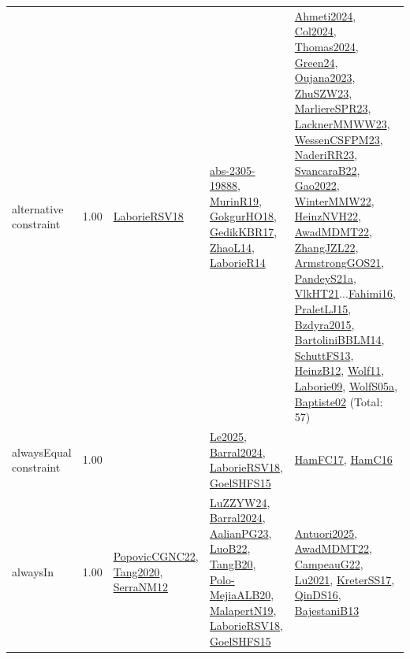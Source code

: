 {\begin{longtable}{p{3cm}r>{\raggedright\arraybackslash}p{6cm}>{\raggedright\arraybackslash}p{6cm}>{\raggedright\arraybackslash}p{8cm}}
\index{alternative constraint}\index{Constraints!alternative constraint}alternative constraint &  1.00 & \hyperref[detail:LaborieRSV18]{LaborieRSV18} & \hyperref[detail:abs-2305-19888]{abs-2305-19888}, \hyperref[detail:MurinR19]{MurinR19}, \hyperref[detail:GokgurHO18]{GokgurHO18}, \hyperref[detail:GedikKBR17]{GedikKBR17}, \hyperref[detail:ZhaoL14]{ZhaoL14}, \hyperref[detail:LaborieR14]{LaborieR14} & \hyperref[detail:Ahmeti2024]{Ahmeti2024}, \hyperref[detail:Col2024]{Col2024}, \hyperref[detail:Thomas2024]{Thomas2024}, \hyperref[detail:Green24]{Green24}, \hyperref[detail:Oujana2023]{Oujana2023}, \hyperref[detail:ZhuSZW23]{ZhuSZW23}, \hyperref[detail:MarliereSPR23]{MarliereSPR23}, \hyperref[detail:LacknerMMWW23]{LacknerMMWW23}, \hyperref[detail:WessenCSFPM23]{WessenCSFPM23}, \hyperref[detail:NaderiRR23]{NaderiRR23}, \hyperref[detail:SvancaraB22]{SvancaraB22}, \hyperref[detail:Gao2022]{Gao2022}, \hyperref[detail:WinterMMW22]{WinterMMW22}, \hyperref[detail:HeinzNVH22]{HeinzNVH22}, \hyperref[detail:AwadMDMT22]{AwadMDMT22}, \hyperref[detail:ZhangJZL22]{ZhangJZL22}, \hyperref[detail:ArmstrongGOS21]{ArmstrongGOS21}, \hyperref[detail:PandeyS21a]{PandeyS21a}, \hyperref[detail:VlkHT21]{VlkHT21}...\hyperref[detail:Fahimi16]{Fahimi16}, \hyperref[detail:PraletLJ15]{PraletLJ15}, \hyperref[detail:Bzdyra2015]{Bzdyra2015}, \hyperref[detail:BartoliniBBLM14]{BartoliniBBLM14}, \hyperref[detail:SchuttFS13]{SchuttFS13}, \hyperref[detail:HeinzB12]{HeinzB12}, \hyperref[detail:Wolf11]{Wolf11}, \hyperref[detail:Laborie09]{Laborie09}, \hyperref[detail:WolfS05a]{WolfS05a}, \hyperref[detail:Baptiste02]{Baptiste02} (Total: 57)\\
\index{alwaysEqual constraint}\index{Constraints!alwaysEqual constraint}alwaysEqual constraint &  1.00 &  & \hyperref[detail:Le2025]{Le2025}, \hyperref[detail:Barral2024]{Barral2024}, \hyperref[detail:LaborieRSV18]{LaborieRSV18}, \hyperref[detail:GoelSHFS15]{GoelSHFS15} & \hyperref[detail:HamFC17]{HamFC17}, \hyperref[detail:HamC16]{HamC16}\\
\index{alwaysIn}\index{Constraints!alwaysIn}alwaysIn &  1.00 & \hyperref[detail:PopovicCGNC22]{PopovicCGNC22}, \hyperref[detail:Tang2020]{Tang2020}, \hyperref[detail:SerraNM12]{SerraNM12} & \hyperref[detail:LuZZYW24]{LuZZYW24}, \hyperref[detail:Barral2024]{Barral2024}, \hyperref[detail:AalianPG23]{AalianPG23}, \hyperref[detail:LuoB22]{LuoB22}, \hyperref[detail:TangB20]{TangB20}, \hyperref[detail:Polo-MejiaALB20]{Polo-MejiaALB20}, \hyperref[detail:MalapertN19]{MalapertN19}, \hyperref[detail:LaborieRSV18]{LaborieRSV18}, \hyperref[detail:GoelSHFS15]{GoelSHFS15} & \hyperref[detail:Antuori2025]{Antuori2025}, \hyperref[detail:AwadMDMT22]{AwadMDMT22}, \hyperref[detail:CampeauG22]{CampeauG22}, \hyperref[detail:Lu2021]{Lu2021}, \hyperref[detail:KreterSS17]{KreterSS17}, \hyperref[detail:QinDS16]{QinDS16}, \hyperref[detail:BajestaniB13]{BajestaniB13}\\

\end{longtable}}
